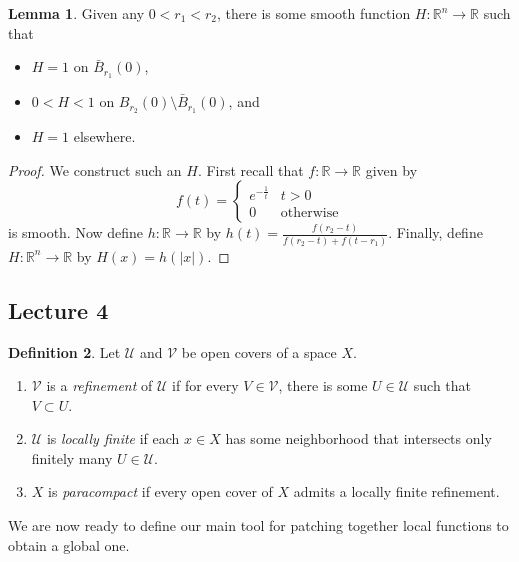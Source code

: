 \documentclass[10pt,letterpaper,cm]{nupset}
\theoremstyle{definition}
\newtheorem{definition}{Definition}[subsection]
\theoremstyle{theorem}
\newtheorem{lemma}[definition]{Lemma}
\theoremstyle{remark}
\newcommand{\R}{\mathbb R}
\newcommand{\1}{\mathbf{1}}
\newcommand{\0}{\vec 0}
\begin{document}
\begin{lemma}\label{l5}
Given any $0<r_1<r_2$, there is some smooth function $H: \R^n \to \R$ such that 
\begin{itemize}
\item $H =1$ on $\bar{B}_{r_1}(0)$, 
\item $0<H <1$ on $B_{r_2}(0)\setminus \bar{B}_{r_1}(0)$, and
\item $H=1$ elsewhere. 
\end{itemize}
\end{lemma}
\begin{proof}
We construct such an $H$. First recall that $f: \R \to \R$ given by 
\[
f(t) = \begin{cases}
e^{-\frac{1}{t}} & t>0
\\ 0 & \text{otherwise}
\end{cases}
\] is smooth. Now define $h: \R \to \R$ by $h(t) = \frac{f(r_2-t)}{f(r_2-t)+ f(t-r_1)}$. Finally, define $H: \R^n \to \R$ by $H(x) = h(\lvert{x}\rvert)$.
\end{proof}

\subsection{Lecture 4}



\begin{definition}
Let $\mathcal{U}$ and $\mathcal{V}$ be open covers of a space $X$.
\begin{enumerate}
\item  $\mathcal{V}$ is a \textit{refinement} of $\mathcal{U}$ if for every $V\in \mathcal{V}$, there is some $U \in \mathcal{U}$ such that $V \subset U$.
\item $\mathcal{U}$ is \textit{locally finite} if each $x\in X$ has some neighborhood that intersects only finitely many $U \in \mathcal{U}$. 
\item $X$ is \textit{paracompact} if every open cover of $X$ admits a locally finite refinement.
\end{enumerate}
\end{definition}

\smallskip

We are now ready to define our main tool for patching together local functions to obtain a global one.
\end{document}
